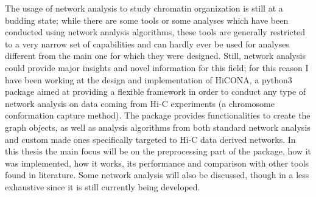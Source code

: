 The usage of network analysis to study chromatin organization is still at a budding state; while there are some tools or some analyses which have been conducted using network analysis algorithms, these tools are generally restricted to a very narrow set of capabilities and can hardly ever be used for analyses different from the main one for which they were designed. Still, network analysis could provide major insights and novel information for this field; for this reason I have been working at the design and implementation of HiCONA, a python3 package aimed at providing a flexible framework in order to conduct any type of network analysis on data coming from Hi-C experiments (a chromosome conformation capture method). The package provides functionalities to create the graph objects, as well as analysis algorithms from both standard network analysis and custom made ones specifically targeted to Hi-C data derived networks. In this thesis the main focus will be on the preprocessing part of the package, how it was implemented, how it works, its performance and comparison with other tools found in literature. Some network analysis will also be discussed, though in a less exhaustive since it is still currently being developed.
